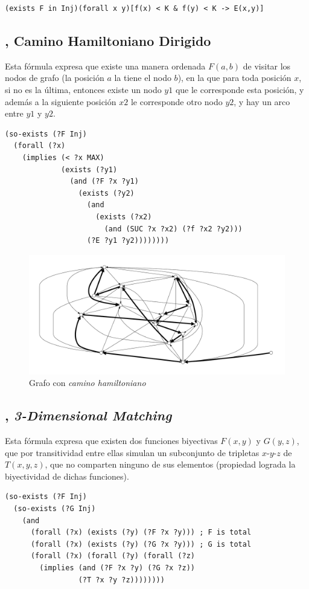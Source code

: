 \begin{verbatim}
(exists F in Inj)(forall x y)[f(x) < K & f(y) < K -> E(x,y)]
\end{verbatim}

\subsection{\CHD, Camino Hamiltoniano Dirigido}
Esta fórmula expresa que existe una manera ordenada $F(a,b)$ de visitar los nodos de grafo (la posición $a$ la tiene el nodo $b$), en
la que para toda posición $x$, si no es la última, entonces existe un nodo $y1$ que le corresponde esta posición, y además
a la siguiente posición $x2$ le corresponde otro nodo $y2$, y hay un arco entre $y1$ y $y2$.
\begin{verbatim}
(so-exists (?F Inj)
  (forall (?x)
    (implies (< ?x MAX)
             (exists (?y1)
               (and (?F ?x ?y1)
                 (exists (?y2)
                   (and
                     (exists (?x2) 
                       (and (SUC ?x ?x2) (?f ?x2 ?y2)))
                   (?E ?y1 ?y2))))))))
\end{verbatim}

\begin{figure}[h!]
\centering
\includegraphics[width=\textwidth]{figuras/chd.pdf}
\caption[Grafo con \textit{camino hamiltoniano}]{Grafo con \textit{camino hamiltoniano}}
\label{hamil}  
\end{figure}

\subsection{\TDM, \textit{3-Dimensional Matching}}
Esta fórmula expresa que existen dos funciones biyectivas $F(x,y)$ y $G(y,z)$, que por 
transitividad entre ellas simulan un subconjunto de tripletas $x$-$y$-$z$ de  $T(x,y,z)$,
que no comparten ninguno de sus elementos (propiedad lograda la biyectividad de
dichas funciones).
\begin{verbatim}
(so-exists (?F Inj)
  (so-exists (?G Inj)
    (and
      (forall (?x) (exists (?y) (?F ?x ?y))) ; F is total
      (forall (?x) (exists (?y) (?G ?x ?y))) ; G is total
      (forall (?x) (forall (?y) (forall (?z)
        (implies (and (?F ?x ?y) (?G ?x ?z))
                 (?T ?x ?y ?z))))))))
\end{verbatim}

